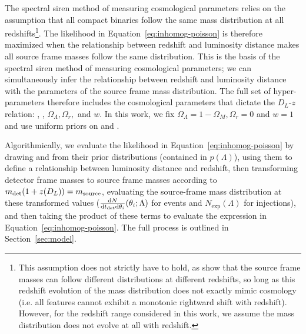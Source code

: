 \documentclass[]{aastex631}
\begin{document}
The spectral siren method of measuring cosmological parameters relies on the assumption that all compact binaries follow the same mass distribution at all redshifts\footnote{This assumption does not strictly have to hold, as \citet{ezquiaga_spectral_2022} show that the source frame masses can follow different distributions at different redshifts, so long as this redshift evolution of the mass distribution does not exactly mimic cosmology (i.e. all features cannot exhibit a monotonic rightward shift with redshift). However, for the redshift range considered in this work, we assume the mass distribution does not evolve at all with redshift.}.
The likelihood in Equation~\ref{eq:inhomog-poisson} is therefore maximized when the relationship between redshift and luminosity distance makes all source frame masses follow the same distribution.
This is the basis of the spectral siren method of measuring cosmological parameters; we can simultaneously infer the relationship between redshift and luminosity distance with the parameters of the source frame mass distribution.
The full set of hyper-parameters therefore includes the cosmological parameters that dictate the $D_L$-$z$ relation: \Ho, \Omm, $\Omega_\Lambda, \Omega_r,$ and $w$.
In this work, we fix $\Omega_\Lambda=1-\Omega_M, \Omega_r=0$ and $w=1$ and use uniform priors on \Ho{} and \Omm{}.

Algorithmically, we evaluate the likelihood in Equation~\ref{eq:inhomog-poisson} by drawing \Ho{} and \Omm{} from their prior distributions (contained in $p(\Lambda)$), using them to define a relationship between luminosity distance and redshift, then transforming detector frame masses to source frame masses according to $m_{\det} (1+z(D_L)) = m_{\text{source}}$, evaluating the source-frame mass distribution at these transformed values ($\frac{\text{d} N}{\text{d} t_{\det} \text{d} \theta_i} (\theta_i;\Lambda)$ for events and $N_{\text{exp}}(\Lambda)$ for injections), and then taking the product of these terms to evaluate the expression in Equation~\ref{eq:inhomog-poisson}.
The full process is outlined in Section~\ref{sec:model}.
\end{document}

